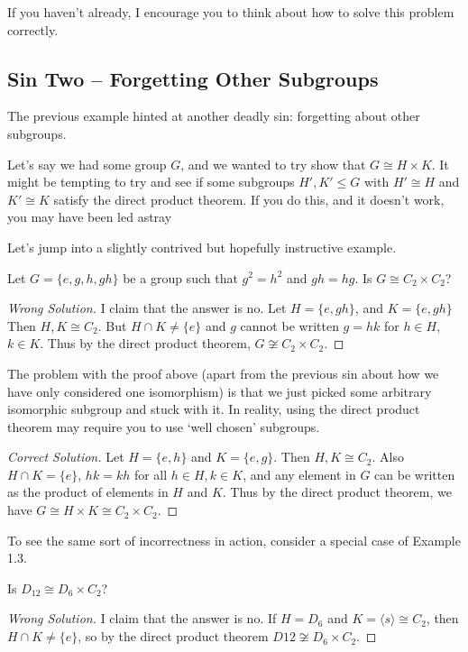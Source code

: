 \documentclass[11pt]{article}
\begin{document}
If you haven't already, I encourage you to think about how to solve this problem correctly.

\subsection{Sin Two -- Forgetting Other Subgroups}

The previous example hinted at another deadly sin: forgetting about other subgroups.

Let's say we had some group $G$, and we wanted to try show that $G \cong H \times K$. It might be tempting to try and see if some subgroups $H', K' \leq G$ with $H' \cong H$ and $K' \cong K$ satisfy the direct product theorem. If you do this, and it doesn't work, you may have been led astray

Let's jump into a slightly contrived but hopefully instructive example.

\begin{example}[Contrived]
	Let $G = \{e, g, h, gh \}$ be a group such that $g^2 = h^2$ and $gh = hg$. Is $G \cong C_2 \times C_2$?
\end{example}
\begin{proof}[{\color{Maroon}Wrong Solution}]
	I claim that the answer is {\color{Maroon} no}. Let $H = \{e, gh \}$, and $K = \{e, gh\}$ Then $H, K \cong C_2$. But $H \cap K \neq \{e\}$ and $g$ cannot be written $g = hk$ for $h \in H$, $k \in K$. Thus by the direct product theorem, $G \not \cong C_2 \times C_2$.   
\end{proof}

The problem with the proof above (apart from the previous sin about how we have only considered one isomorphism) is that we just picked some arbitrary isomorphic subgroup and stuck with it. In reality, using the direct product theorem may require you to use `well chosen' subgroups.

\begin{proof}[{\color{ForestGreen}Correct Solution}]
	Let $H = \{e, h\}$ and $K = \{e, g\}$. Then $H, K \cong C_2$. Also $H \cap K = \{e\}$, $hk = kh$ for all $h \in H, k \in K$, and any element in $G$ can be written as the product of elements in $H$ and $K$. Thus by the direct product theorem, we have $G \cong H \times K \cong C_2 \times C_2$.
\end{proof}

To see the same sort of incorrectness in action, consider a special case of Example 1.3.

\begin{example}
	Is $D_{12} \cong D_6 \times C_2$?
\end{example}
\begin{proof}[{\color{Maroon}Wrong Solution}]
	I claim that the answer is {\color{Maroon} no}. If $H = D_6$ and $K = \langle s \rangle \cong C_2$, then $H \cap K \neq \{e \}$, so by the direct product theorem $D{12} \not \cong D_6 \times C_2$.   
\end{proof}
\end{document}
